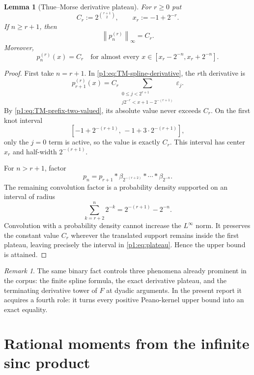 \documentclass[11pt]{article}
\numberwithin{equation}{section}
\newtheorem{lemma}[theorem]{Lemma}
\theoremstyle{definition}
\theoremstyle{remark}
\newtheorem{remark}[theorem]{Remark}
\newcommand{\norm}[1]{\left\lVert#1\right\rVert}
\newcommand{\TM}{\varepsilon}
\begin{document}
\begin{lemma}[Thue--Morse derivative plateau]
\label{p1:lem:plateau}
For $r\ge0$ put
\begin{equation}
 C_r:=2^{\binom{r+1}{2}},
 \qquad
 x_r:=-1+2^{-r}.
 \label{p1:eq:Cr-xr}
\end{equation}
If $n\ge r+1$, then
\begin{equation}
 \boxed{\norm{p_n^{(r)}}_\infty=C_r.}
 \label{p1:eq:derivative-norm}
\end{equation}
Moreover,
\begin{equation}
 p_n^{(r)}(x)=C_r
 \quad\text{for almost every }x\in[x_r-2^{-n},x_r+2^{-n}].
 \label{p1:eq:plateau}
\end{equation}
\end{lemma}

\begin{proof}
First take $n=r+1$.  In \eqref{p1:eq:TM-spline-derivative}, the $r$th derivative is
\[
 p_{r+1}^{(r)}(x)=C_r
 \sum_{\substack{0\le j<2^{r+1}\\ j2^{-r}<x+1-2^{-(r+1)}}}\TM_j.
\]
By \eqref{p1:eq:TM-prefix-two-valued}, its absolute value never exceeds $C_r$.  On the first knot interval
\[
 [-1+2^{-(r+1)},\,-1+3\cdot2^{-(r+1)}],
\]
only the $j=0$ term is active, so the value is exactly $C_r$.  This interval has center $x_r$ and half-width $2^{-(r+1)}$.

For $n>r+1$, factor
\[
 p_n=p_{r+1}*\beta_{2^{-(r+2)}}*\cdots*\beta_{2^{-n}}.
\]
The remaining convolution factor is a probability density supported on an interval of radius
\[
 \sum_{k=r+2}^{n}2^{-k}=2^{-(r+1)}-2^{-n}.
\]
Convolution with a probability density cannot increase the $L^\infty$ norm.  It preserves the constant value $C_r$ wherever the translated support remains inside the first plateau, leaving precisely the interval in \eqref{p1:eq:plateau}.  Hence the upper bound is attained.
\end{proof}

\begin{remark}
The same binary fact controls three phenomena already prominent in the corpus: the finite spline formula, the exact derivative plateau, and the terminating derivative tower of $F$ at dyadic arguments.  In the present report it acquires a fourth role: it turns every positive Peano-kernel upper bound into an exact equality.
\end{remark}

\section{Rational moments from the infinite sinc product}
\label{p1:sec:moments}
\end{document}
